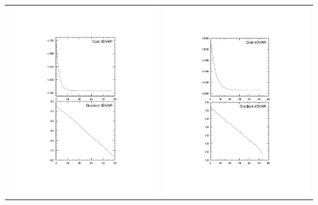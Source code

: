 \documentclass[10pt]{beamer}
\begin{document}
{\begin{tabular}{l r}
\includegraphics[scale=0.30, trim=10 5 100 50, clip]{3dvar_cost_grad.pdf} & \includegraphics[scale=0.30, trim=150 5 10 50, clip]{4dvar_cost_grad.pdf}
\end{tabular}
}
\end{document}
